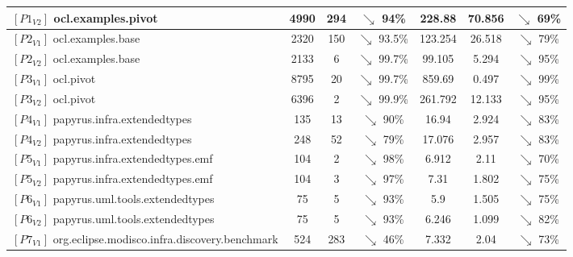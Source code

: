 \begin{table}
{\begin{tabular}{lcccccc}
		$[P1_{V2}]$ ocl.examples.pivot & 4990 & 294 & \cellcolor{green!40}$\searrow$ 94\%  & 228.88  & 70.856 & \cellcolor{green!25}$\searrow$ 69\% \\ \midrule
		
		$[P2_{V1}]$ ocl.examples.base & 2320 & 150 & \cellcolor{green!40}$\searrow$ 93.5\%  & 123.254 & 26.518& \cellcolor{green!30}$\searrow$ 79\% \\ \midrule
		
		$[P2_{V2}]$ ocl.examples.base & 2133 & 6 & \cellcolor{green!40}$\searrow$ 99.7\%  & 99.105 & 5.294 & \cellcolor{green!40}$\searrow$ 95\% \\ \midrule
		
		
		$[P3_{V1}]$ ocl.pivot & 8795 & 20 & \cellcolor{green!40}$\searrow$ 99.7\%  &859.69 &  0.497& \cellcolor{green!40}$\searrow$ 99\% \\ \midrule
		
		$[P3_{V2}]$ ocl.pivot & 6396 & 2 & \cellcolor{green!40}$\searrow$ 99.9\%  & 261.792 & 12.133 & \cellcolor{green!40}$\searrow$ 95\% \\ \midrule
		
		$[P4_{V1}]$ papyrus.infra.extendedtypes & 135 & 13 & \cellcolor{green!40}$\searrow$ 90\%  &16.94 &  2.924& \cellcolor{green!35}$\searrow$ 83\% \\ \midrule
		
		$[P4_{V2}]$ papyrus.infra.extendedtypes & 248 & 52 & \cellcolor{green!30}$\searrow$ 79\%  & 17.076 & 2.957& \cellcolor{green!35}$\searrow$ 83\% \\\midrule
		
		$[P5_{V1}]$ papyrus.infra.extendedtypes.emf & 104 & 2 & \cellcolor{green!40}$\searrow$ 98\%  & 6.912& 2.11& \cellcolor{green!25}$\searrow$ 70\% \\ \midrule
		$[P5_{V2}]$ papyrus.infra.extendedtypes.emf & 104 & 3  & \cellcolor{green!40}$\searrow$ 97\%  & 7.31& 1.802 & \cellcolor{green!25}$\searrow$ 75\% \\ \midrule
		
		$[P6_{V1}]$ papyrus.uml.tools.extendedtypes & 75 & 5 & \cellcolor{green!40}$\searrow$ 93\%  &5.9 & 1.505 & \cellcolor{green!25}$\searrow$ 75\% \\ \midrule
		
		$[P6_{V2}]$ papyrus.uml.tools.extendedtypes & 75 & 5 &  \cellcolor{green!40}$\searrow$ 93\% & 6.246 & 1.099& \cellcolor{green!35}$\searrow$ 82\% \\ \midrule
		
		$[P7_{V1}]$ org.eclipse.modisco.infra.discovery.benchmark& 524 & 283 & \cellcolor{green!10}$\searrow$ 46\%  & 7.332 & 2.04 & \cellcolor{green!25}$\searrow$ 73\%  \\ \midrule
		

\end{tabular}}
\end{table}
